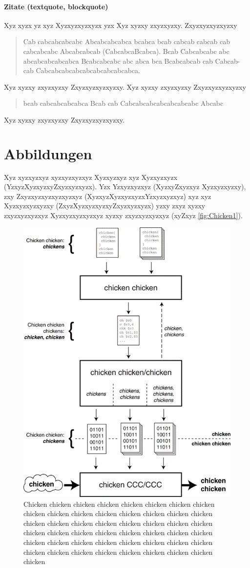 \paragraph{Zitate (textquote, blockquote)}
Xyz xyzx yz xyz Xyzxyzxyzxyzx yzx  Xyz xyzxy zxyzxyzxy. Zxyzxyzxyzxyzxy \blockquote[{\cite{shao+:1994:unrolling-lists}}]{Cab cabcabcabcabc Abcabcabcabca bcabca bcab cabcab cabcab cab cabcabcabc Abcabcabcab (CabcabcaBcabca). Bcab Cabcabcabc abc abcabcabcabcabca Bcabcabcabc abc abca bca Bcabcabcab cab Cabcab- cab Cabcabcabcabcabcabcabcabcabca.} Xyz xyzxy zxyzxyzxy Zxyzxyzxyzxyzxy. Xyz xyzxy zxyzxyzxy Zxyzxyzxyzxyzxy \blockquote[{\cite{shao+:1994:unrolling-lists}}]{bcab cabcabcabcabca Bcab cab Cabcabcabcabcabcabcabc Abcabc} Xyz xyzxy zxyzxyzxy Zxyzxyzxyzxyzxy.


\section{Abbildungen}
Xyz xyzxyzxyz xyzxyzxyzxyz Xyzxyzxyz xyz Xyzxyzxyzx (YzxyzXyzxyzxyZxyzxyzxyzx). Yzx Yzxyzxyzxyz (XyzxyZxyzxyz Xyzxyzxyzxy), zxy Zxyzxyzxyzxyzxyzxyz (XyzxyzXyzxyzxyzxYzxyzxyzxyz) xyz xyz Xyzxyzxyzxyzxy (ZxyzXyzxyzxyzxyZxyzxyzxyzx) yzxy zxyz xyzxy zxyzxyzxyzxyz Xyzxyzxyzxyzxyz xyzxy zxyzxyzxyzxyz (xyZxyz \autoref{fig:Chicken1}).

\begin{figure}[!hb]
	\centering
	\includegraphics[width=0.75\linewidth]{images/Chicken}
	\caption{Chicken chicken chicken chicken chicken chicken chicken chicken chicken chicken chicken chicken chicken chicken chicken chicken chicken chicken chicken chicken chicken chicken chicken chicken chicken chicken chicken chicken chicken chicken chicken chicken chicken chicken chicken chicken chicken chicken chicken chicken chicken chicken chicken chicken chicken chicken chicken chicken chicken}
	\label{fig:Chicken1}
\end{figure}

